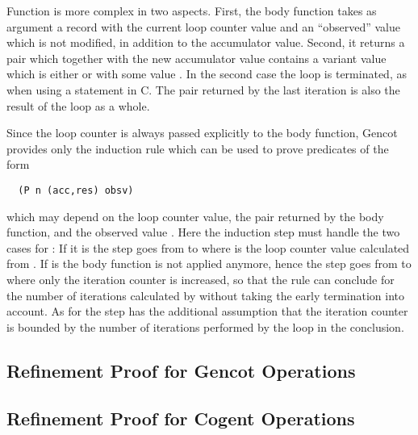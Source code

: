Function  is more complex in two aspects. First, the body function takes as argument a record 
with the current loop counter value  and an ``observed'' value  which is not modified, in addition to the 
accumulator value. Second, it returns a pair  which together with the new accumulator value  contains 
a variant value  which is either  or  with some value . In the second case
the loop is terminated, as when using a  statement in C. The pair returned by the last iteration is also the result 
of the loop as a whole.

Since the loop counter is always passed explicitly to the body function, Gencot provides only the induction rule 
which can be used to prove predicates of the form
\begin{verbatim}
  (P n (acc,res) obsv)
\end{verbatim}
which may depend on the loop counter value, the pair  returned by the body function, and the observed value .
Here the induction step must handle the two cases for : If it is  the step goes from 
to  where  is the loop counter value calculated from . If  is
 the body function is not applied anymore, hence the step goes from  to 
 where only the iteration counter is increased, so that the rule can conclude  for the 
number of iterations calculated by  without taking the early termination into account. As for 
the step has the additional assumption that the iteration counter  is bounded by the number
of iterations performed by the loop in the conclusion.

\subsection{Refinement Proof for Gencot Operations}
\label{design-isabelle-gencotprf}

\subsection{Refinement Proof for Cogent Operations}
\label{design-isabelle-cogentprf}
